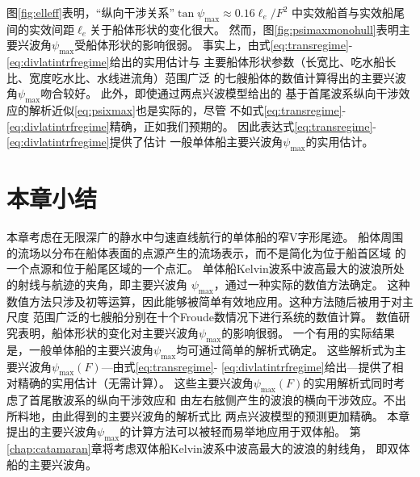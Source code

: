 图\ref{fig:elleff}表明，``纵向干涉关系''$\tan\psi_{\max}\approx0.16\ell_e/F^2$
中实效船首与实效船尾间的实效间距$\ell_e$关于船体形状的变化很大。
然而，图\ref{fig:psimaxmonohull}表明主要兴波角$\psi_{\max}$受船体形状的影响很弱。
事实上，由式\eqref{eq:transregime}-\eqref{eq:divlatintrfregime}给出的实用估计与
主要船体形状参数（长宽比、吃水船长比、宽度吃水比、水线进流角）范围广泛
的七艘船体的数值计算得出的主要兴波角$\psi_{\max}$吻合较好。
此外，即使通过两点兴波模型\supercite{Noblesse2014Why}给出的
基于首尾波系纵向干涉效应的解析近似\eqref{eq:psixmax}也是实际的，尽管
不如式\eqref{eq:transregime}-\eqref{eq:divlatintrfregime}精确，正如我们预期的。
因此表达式\eqref{eq:transregime}-\eqref{eq:divlatintrfregime}提供了估计
一般单体船主要兴波角$\psi_{\max}$的实用估计。

\section{本章小结}

本章考虑在无限深广的静水中匀速直线航行的单体船的窄V字形尾迹。
船体周围的流场以分布在船体表面的点源产生的流场表示，而不是简化为位于船首区域
的一个点源和位于船尾区域的一个点汇。
单体船Kelvin波系中波高最大的波浪所处的射线与航迹的夹角，即主要兴波角
$\psi_{\max}$，通过一种实际的数值方法确定。
这种数值方法只涉及初等运算，因此能够被简单有效地应用。这种方法随后被用于对主尺度
范围广泛的七艘船分别在十个Froude数情况下进行系统的数值计算。
数值研究表明，船体形状的变化对主要兴波角$\psi_{\max}$的影响很弱。
一个有用的实际结果是，一般单体船的主要兴波角$\psi_{\max}$均可通过简单的解析式确定。
这些解析式为主要兴波角$\psi_{\max}(F)$---由式\eqref{eq:transregime}-
\eqref{eq:divlatintrfregime}给出---提供了相对精确的实用估计（无需计算）。
这些主要兴波角$\psi_{\max}(F)$的实用解析式同时考虑了首尾散波系的纵向干涉效应和
由左右舷侧产生的波浪的横向干涉效应。不出所料地，由此得到的主要兴波角的解析式比
两点兴波模型\supercite{Noblesse2014Why}的预测更加精确。
本章提出的主要兴波角$\psi_{\max}$的计算方法可以被轻而易举地应用于双体船。
第\ref{chap:catamaran}章将考虑双体船Kelvin波系中波高最大的波浪的射线角，
即双体船的主要兴波角。



